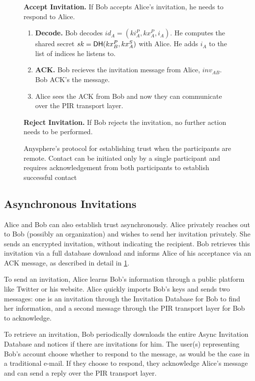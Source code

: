 \begin{figure}[!th]
\begin{framed}
{\begin{hangparas}{1em}{1}
    \medskip

      \textbf{Accept Invitation.}
          If Bob accepts Alice's invitation, he needs to respond to Alice.
          \begin{enumerate}
              \item \textbf{Decode.} Bob decodes $id_A = (ki_A^P, kx_A^P, i_A)$. He computes the shared secret $sk =  \mathsf{DH}(kx_B^P, kx^S_A)$ with Alice. He adds $i_A$ to the list of indices he listens to.
              \item \textbf{ACK.} Bob recieves the invitation message from Alice, $inv_{AB}$. Bob ACK's the message.
              \item Alice sees the ACK from Bob and now they can communicate over the PIR transport layer.
          \end{enumerate}
    \medskip
          
      \textbf{Reject Invitation.}
        If Bob rejects the invitation, no further action needs to be performed.
  \end{hangparas}
  }
  \end{framed}
  \caption{Anysphere's protocol for establishing trust when the participants are remote. Contact can be initiated only by a single participant and requires acknowledgement from both participants to establish successful contact}
  \label{fig:trust-establishment-async}
\end{figure}


\subsection{Asynchronous Invitations}
Alice and Bob can also establish trust asynchronously. Alice privately reaches out to Bob (possibly an organization) and wishes to send her invitation privately. She sends an encrypted invitation, without indicating the recipient. Bob retrieves this invitation via a full database download and informs Alice of his acceptance via an ACK message, as described in detail in \cref{fig:trust-establishment-async}.

To send an invitation, Alice learns Bob's information through a public platform like Twitter or his website. Alice quickly imports Bob's keys and sends two messages: one is an invitation through the Invitation Database for Bob to find her information, and a second message through the PIR transport layer for Bob to acknowledge.

To retrieve an invitation, Bob periodically downloads the entire Async Invitation Database and notices if there are invitations for him. The user(s) representing Bob's account choose whether to respond to the message, as would be the case in a traditional e-mail. If they choose to respond, they acknowledge Alice's message and can send a reply over the PIR transport layer.

